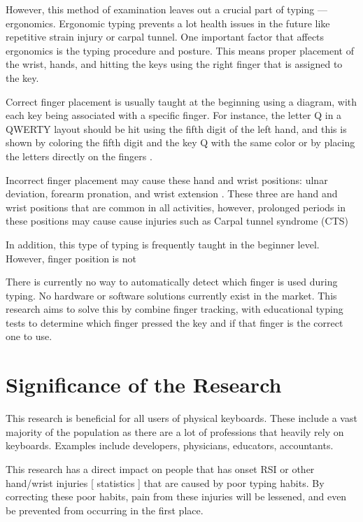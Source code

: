 \documentclass{report}
\begin{document}
However, this method of examination leaves out a crucial part of typing —
ergonomics. Ergonomic typing prevents a lot health issues in the future like
repetitive strain injury or carpal tunnel. One important factor that affects
ergonomics is the typing procedure and posture. This means proper placement of
the wrist, hands, and hitting the keys using the right finger that is assigned
to the key.

Correct finger placement is usually taught at the beginning using a diagram,
with each key being associated with a specific finger. For instance, the letter
Q in a QWERTY layout should be hit using the fifth digit of the left hand, and
this is shown by coloring the fifth digit and the key Q with the same color or
by placing the letters directly on the fingers \parencite{dobson2009touch}.

Incorrect finger placement may cause these hand and wrist positions: ulnar
deviation, forearm pronation, and wrist extension \parencite{serina1999}. These
three are hand and wrist positions that are common in all activities, however,
prolonged periods in these positions may cause cause injuries such as Carpal
tunnel syndrome (CTS) \parencite{toosi2015}

In addition, this type of typing is frequently taught in the beginner level.
However, finger position is not \parencite{donica2018}

There is currently no way to automatically detect which finger is used during
typing. No hardware or software solutions currently exist in the market. This
research aims to solve this by combine finger tracking, with educational typing
tests to determine which finger pressed the key and if that finger is the
correct one to use.

\section{Significance of the Research}
This research is beneficial for all users of physical keyboards. These include a
vast majority of the population as there are a lot of professions that heavily
rely on keyboards. Examples include developers, physicians, educators,
accountants.

This research has a direct impact on people that has onset RSI or other
hand/wrist injuries [ statistics ] that are caused by poor typing habits. By
correcting these poor habits, pain from these injuries will be lessened, and
even be prevented from occurring in the first place.

\newpage
\nocite{*} \printbibliography[heading=bibintoc,title={References}]{}
\end{document}
